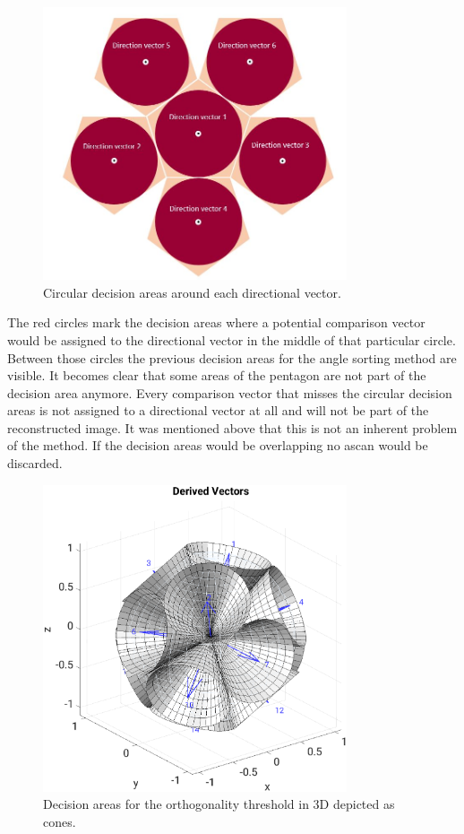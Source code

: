 \begin{figure}[H]
    \centering
    \includegraphics[width=0.8\textwidth]{Graphics/decision_area_Circles.jpg}
    \caption{Circular decision areas around each directional vector.}
    \label{decision_arbitrary_circular}
\end{figure}

The red circles mark the decision areas where a potential comparison vector would be assigned to the directional vector in the middle of that particular circle. Between those circles the previous decision areas for the angle sorting method are visible. It becomes clear that some areas of the pentagon are not part of the decision area anymore. Every comparison vector that misses the circular decision areas is not assigned to a directional vector at all and will not be part of the reconstructed image. It was mentioned above that this is not an inherent problem of the method. If the decision areas would be overlapping no \ac{ascan} would be discarded. 


\begin{figure}[H]
    \centering
    \includegraphics[width=0.8\textwidth]{Graphics/decision_cones.eps}
    \caption{Decision areas for the orthogonality threshold in 3D depicted as cones.}
    \label{figdecisioncones}
\end{figure}


